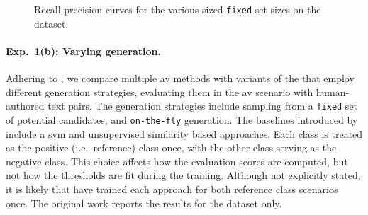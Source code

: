 \begin{figure}[htbp]
    \centering
    
    \caption[Recall-precision curves for the various sized \imp{} set sizes]{Recall-precision curves for the various sized \texttt{fixed} \imp{} set sizes on the \dataBlog{} dataset.
    }
    \label{fig:blog_dif_n}
\end{figure}



%     
%     


\paragraph{Exp.\ 1(b): Varying \imp{} generation.}

Adhering to \citet{koppel_determining_2014}, we compare multiple \ac{av} methods with variants of the \impAppr{} that employ different \imp{} generation strategies, evaluating them in the \ac{av} scenario with human-authored text pairs.
The \imp{} generation strategies include sampling from a \texttt{fixed} set of potential \imp{} candidates, and \texttt{on-the-fly} \imp{} generation. 
The baselines introduced by \citet{koppel_determining_2014} include a \ac{svm} and unsupervised similarity based approaches.
Each class is treated as the positive (i.e.\ reference) class once, with the other class serving as the negative class. 
This choice affects how the evaluation scores are computed, but not how the thresholds are fit during the training.
Although not explicitly stated, it is likely that \citet{koppel_determining_2014} have trained each approach for both reference class scenarios once.
The original work reports the results for the \dataBlog{} dataset only.

